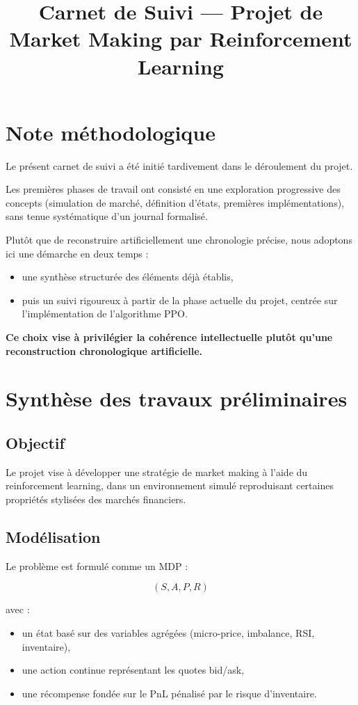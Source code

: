 \documentclass[11pt,a4paper]{article}
\title{\textbf{Carnet de Suivi --- Projet de Market Making par Reinforcement Learning}}
\author{}
\date{}
\begin{document}
\maketitle

\section{Note méthodologique}

Le présent carnet de suivi a été initié tardivement dans le déroulement du projet.

Les premières phases de travail ont consisté en une exploration progressive des concepts (simulation de marché, définition d'états, premières implémentations), sans tenue systématique d'un journal formalisé.

Plutôt que de reconstruire artificiellement une chronologie précise, nous adoptons ici une démarche en deux temps :
\begin{itemize}
    \item une synthèse structurée des éléments déjà établis,
    \item puis un suivi rigoureux à partir de la phase actuelle du projet, centrée sur l'implémentation de l'algorithme PPO.
\end{itemize}

\textbf{Ce choix vise à privilégier la cohérence intellectuelle plutôt qu'une reconstruction chronologique artificielle.}

\section{Synthèse des travaux préliminaires}

\subsection{Objectif}

Le projet vise à développer une stratégie de market making à l'aide du reinforcement learning, dans un environnement simulé reproduisant certaines propriétés stylisées des marchés financiers.

\subsection{Modélisation}

Le problème est formulé comme un MDP :

\[
(S, A, P, R)
\]

avec :
\begin{itemize}
    \item un état basé sur des variables agrégées (micro-price, imbalance, RSI, inventaire),
    \item une action continue représentant les quotes bid/ask,
    \item une récompense fondée sur le PnL pénalisé par le risque d'inventaire.
\end{itemize}
\end{document}
